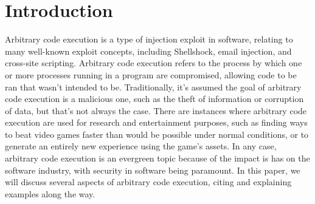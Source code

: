 \section{Introduction}

Arbitrary code execution is a type of injection exploit in software, relating to many well-known exploit concepts, including Shellshock, email injection, and cross-site scripting. Arbitrary code execution refers to the process by which one or more processes running in a program are compromised, allowing code to be ran that wasn’t intended to be. Traditionally, it’s assumed the goal of arbitrary code execution is a malicious one, such as the theft of information or corruption of data, but that’s not always the case. There are instances where arbitrary code execution are used for research and entertainment purposes, such as finding ways to beat video games faster than would be possible under normal conditions, or to generate an entirely new experience using the game’s assets. In any case, arbitrary code execution is an evergreen topic because of the impact is has on the software industry, with security in software being paramount. In this paper, we will discuss several aspects of arbitrary code execution, citing and explaining examples along the way.